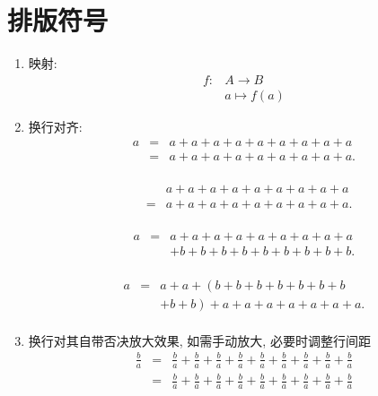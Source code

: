 \documentclass[a4paper, 11pt, UTF8]{article}
\theoremstyle{plain}
\theoremstyle{definition}
\theoremstyle{remark}
\begin{document}
	\section{排版符号}
	
	\begin{enumerate}[1、]
		\item 映射:
		\[ \begin{array}{*{20}{c}}
			f: & A \rightarrow B \\
			& a \mapsto f(a)
		\end{array} \]
	
		\item  换行对齐:
		\begin{displaymath}
			\begin{array}{lll}
				a&=&a+a+a+a+a+a+a+a+a\\
				&=&a+a+a+a+a+a+a+a+a.\\
			\end{array}	
		\end{displaymath}
		
		\begin{displaymath}
			\begin{array}{lll}
				&&a+a+a+a+a+a+a+a+a\\
				&=&a+a+a+a+a+a+a+a+a.\\
			\end{array}	
		\end{displaymath}
	
		\begin{displaymath}
			\begin{array}{lll}
				a&=&a+a+a+a+a+a+a+a+a\\
				&&+b+b+b+b+b+b+b+b+b.\\
			\end{array}	
		\end{displaymath}
	
		\begin{displaymath}
			\begin{array}{lll}
				a&=&a+a+\left(b+b+b+b+b+b+b\right. \\
				&&+\left.b+b\right)+a+a+a+a+a+a+a.\\
			\end{array}	
		\end{displaymath}
	
		\item 换行对其自带否决放大效果, 如需手动放大, 必要时调整行间距
		\renewcommand*{\arraystretch}{1.5}
		\begin{displaymath}
			\begin{array}{lll}
				\displaystyle\frac{b}{a}&=&\displaystyle\frac{b}{a}+\frac{b}{a}+\frac{b}{a}+\frac{b}{a}+\frac{b}{a}+\frac{b}{a}+\frac{b}{a}+\frac{b}{a}+\frac{b}{a}\\
				&=&\displaystyle\frac{b}{a}+\frac{b}{a}+\frac{b}{a}+\frac{b}{a}+\frac{b}{a}+\frac{b}{a}+\frac{b}{a}+\frac{b}{a}+\frac{b}{a}\\
			\end{array}
		\end{displaymath}
		\renewcommand*{\arraystretch}{1}
		

\end{enumerate}
\end{document}

